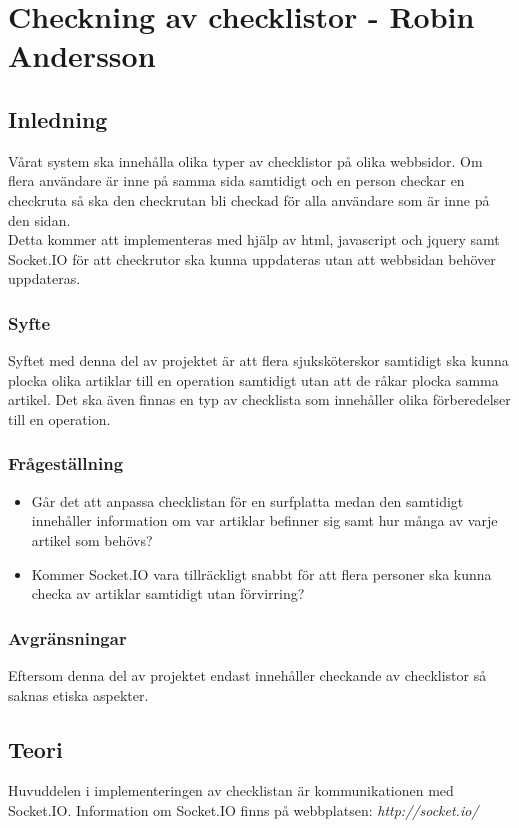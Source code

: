 \section{Checkning av checklistor - Robin Andersson}
\subsection{Inledning}
Vårat system ska innehålla olika typer av checklistor på olika webbsidor. Om flera användare är inne på samma sida samtidigt och en person checkar en checkruta så ska den checkrutan bli checkad för alla användare som är inne på den sidan.\\

Detta kommer att implementeras med hjälp av html, javascript och jquery samt Socket.IO för att checkrutor ska kunna uppdateras utan att webbsidan behöver uppdateras.

\subsubsection{Syfte}
Syftet med denna del av projektet är att flera sjuksköterskor samtidigt ska kunna plocka olika artiklar till en operation samtidigt utan att de råkar plocka samma artikel. Det ska även finnas en typ av checklista som innehåller olika förberedelser till en operation. 

\subsubsection{Frågeställning}
\begin{itemize}
\item Går det att anpassa checklistan för en surfplatta medan den samtidigt innehåller information om var artiklar befinner sig samt hur många av varje artikel som behövs?
\item Kommer Socket.IO vara tillräckligt snabbt för att flera personer ska kunna checka av artiklar samtidigt utan förvirring?
\end{itemize}

\subsubsection{Avgränsningar}
Eftersom denna del av projektet endast innehåller checkande av checklistor så saknas etiska aspekter.

\subsection{Teori}
Huvuddelen i implementeringen av checklistan är kommunikationen med Socket.IO. Information om Socket.IO finns på webbplatsen: \textit{http://socket.io/}
 
